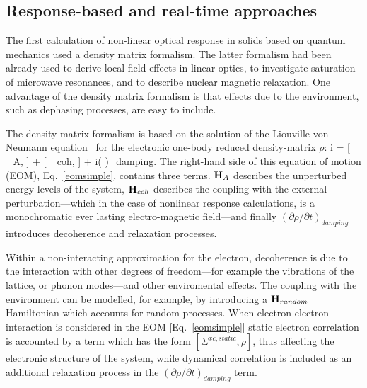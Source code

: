 \subsection{Response-based and real-time approaches}
The first calculation of non-linear optical response in solids based on quantum mechanics used a density matrix formalism.\cite{bloembergen1964quantum} The latter formalism had been already used to derive local field effects in linear optics\cite{PhysRev.126.413,wiser1963dielectric}, to investigate  saturation of microwave resonances\cite{karplus1948note}, and to describe nuclear magnetic relaxation\cite{kubo1954general,RevModPhys.33.249,PhysRev.102.104}. One advantage of the density matrix formalism is that effects due to the environment, such as dephasing processes, are easy to include.\cite{manzano2020short}

The density matrix formalism is based on the solution of the Liouville-von Neumann equation~\cite{neumann} for the electronic one-body reduced density-matrix $\rho$:
\be
i \hbar {} = [ \HH_A, \rho] + [ \HH_{coh}, \rho] + i\hbar \left (  \right )_{damping}.
\label{eomsimple}
\ee
The right-hand side of this equation of motion (EOM), Eq.~\ref{eomsimple}, contains three terms. ${\bf H}_A$ describes the unperturbed energy levels of the system, ${\bf H}_{coh}$ describes the coupling with the external perturbation---which in the case of nonlinear response calculations, is a monochromatic ever lasting electro-magnetic field---and finally $\left ( \partial \rho/\partial t \right )_{damping}$ introduces decoherence and relaxation processes.

Within a non-interacting approximation for the electron, decoherence is due to the interaction with other degrees of freedom---for example the vibrations of the lattice, or phonon modes---and other enviromental effects. The coupling with the environment can be modelled, for example, by introducing a ${\bf H}_{random}$ Hamiltonian which accounts for random processes. %
When electron-electron interaction is considered in the EOM [Eq.~\ref{eomsimple}] static electron correlation is accounted by a term which has the form $[\Sigma^{xc,static},\rho]$, thus affecting the electronic structure of the system, while dynamical correlation is included as an additional relaxation process in the $\left ( \partial \rho/\partial t \right )_{damping}$ term.

